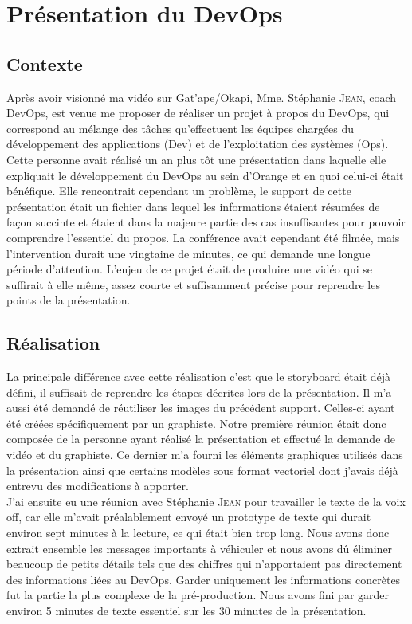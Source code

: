 \section{Présentation du DevOps}


\subsection{Contexte}

Après avoir visionné ma vidéo sur Gat'ape/Okapi, Mme. Stéphanie \textsc{Jean}, coach DevOps,  est venue me proposer de réaliser un projet à propos du DevOps, qui correspond au mélange des tâches qu'effectuent les équipes chargées du développement des applications (Dev) et de l'exploitation des systèmes (Ops). Cette personne avait réalisé un an plus tôt une présentation dans laquelle elle expliquait le développement du DevOps au sein d'Orange et en quoi celui-ci était bénéfique. Elle rencontrait cependant un problème, le support de cette présentation était un fichier dans lequel les informations étaient résumées de façon succinte et étaient dans la majeure partie des cas insuffisantes pour pouvoir comprendre l'essentiel du propos. La conférence avait cependant été filmée, mais l'intervention durait une vingtaine de minutes, ce qui demande une longue période d'attention. L'enjeu de ce projet était de produire une vidéo qui se suffirait à elle même, assez courte et suffisamment précise pour reprendre les points de la présentation.


\subsection{Réalisation}
La principale différence avec cette réalisation c'est que le storyboard était déjà défini, il suffisait de reprendre les étapes décrites lors de la présentation. Il m'a aussi été demandé de réutiliser les images du précédent support. Celles-ci ayant été créées spécifiquement par un graphiste. Notre première réunion était donc composée de la personne ayant réalisé la présentation et effectué la demande de vidéo et du graphiste. Ce dernier m'a fourni les éléments graphiques utilisés dans la présentation ainsi que certains modèles sous format vectoriel dont j'avais déjà entrevu des modifications à apporter.\\

J'ai ensuite eu une réunion avec Stéphanie \textsc{Jean} pour travailler le texte de la voix off, car elle m'avait préalablement envoyé un prototype de texte qui durait environ sept minutes à la lecture, ce qui était bien trop long. Nous avons donc extrait ensemble les messages importants à véhiculer et nous avons dû éliminer beaucoup de petits détails tels que des chiffres qui n'apportaient pas directement des informations liées au DevOps. Garder uniquement les informations concrètes fut la partie la plus complexe de la pré-production. Nous avons fini par garder environ 5 minutes de texte essentiel sur les 30 minutes de la présentation.\\

